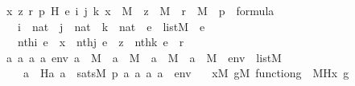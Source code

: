 \begin{isabellebody}
\ \ {\isachardoublequoteopen}{\isasymAnd}x\ z\ r\ p\ H\ e\ i\ j\ k{\isachardot}{\kern0pt}\ x\ {\isasymin}\ M\ {\isasymLongrightarrow}\ z\ {\isasymin}\ M\ {\isasymLongrightarrow}\ r\ {\isasymin}\ M\ {\isasymLongrightarrow}\ p\ {\isasymin}\ formula\ {\isasymLongrightarrow}\isanewline
\ \ \ \ i\ {\isasymin}\ nat\ {\isasymLongrightarrow}\ j\ {\isasymin}\ nat\ {\isasymLongrightarrow}\ k\ {\isasymin}\ nat\ {\isasymLongrightarrow}\ e\ {\isasymin}\ list{\isacharparenleft}{\kern0pt}M{\isacharparenright}{\kern0pt}\ {\isasymLongrightarrow}\ e\ {\isasymnoteq}\ {\isacharbrackleft}{\kern0pt}{\isacharbrackright}{\kern0pt}\ {\isasymLongrightarrow}\ \isanewline
\ \ \ \ nth{\isacharparenleft}{\kern0pt}i{\isacharcomma}{\kern0pt}\ e{\isacharparenright}{\kern0pt}\ {\isacharequal}{\kern0pt}\ x\ {\isasymLongrightarrow}\ nth{\isacharparenleft}{\kern0pt}j{\isacharcomma}{\kern0pt}\ e{\isacharparenright}{\kern0pt}\ {\isacharequal}{\kern0pt}\ z\ {\isasymLongrightarrow}\ nth{\isacharparenleft}{\kern0pt}k{\isacharcomma}{\kern0pt}\ e{\isacharparenright}{\kern0pt}\ {\isacharequal}{\kern0pt}\ r\ {\isasymLongrightarrow}\ \isanewline
\ \ {\isacharparenleft}{\kern0pt}{\isasymAnd}a{}\ a{}\ a{}\ a{}\ env{\isachardot}{\kern0pt}\ a{}\ {\isasymin}\ M\ {\isasymLongrightarrow}\ a{}\ {\isasymin}\ M\ {\isasymLongrightarrow}\ a{}\ {\isasymin}\ M\ {\isasymLongrightarrow}\ a{}\ {\isasymin}\ M\ {\isasymLongrightarrow}\ env\ {\isasymin}\ list{\isacharparenleft}{\kern0pt}M{\isacharparenright}{\kern0pt}\ \isanewline
\ \ \ \ {\isasymLongrightarrow}\ a{}\ {\isacharequal}{\kern0pt}\ H{\isacharparenleft}{\kern0pt}a{}{\isacharcomma}{\kern0pt}\ a{}{\isacharparenright}{\kern0pt}\ {\isasymlongleftrightarrow}\ sats{\isacharparenleft}{\kern0pt}M{\isacharcomma}{\kern0pt}\ p{\isacharcomma}{\kern0pt}\ {\isacharbrackleft}{\kern0pt}a{}{\isacharcomma}{\kern0pt}\ a{}{\isacharcomma}{\kern0pt}\ a{}{\isacharcomma}{\kern0pt}\ a{}{\isacharbrackright}{\kern0pt}\ {\isacharat}{\kern0pt}\ env{\isacharparenright}{\kern0pt}{\isacharparenright}{\kern0pt}\ {\isasymLongrightarrow}\isanewline
\ \ {\isacharparenleft}{\kern0pt}{\isasymforall}x{\isacharbrackleft}{\kern0pt}{\isacharhash}{\kern0pt}{\isacharhash}{\kern0pt}M{\isacharbrackright}{\kern0pt}{\isachardot}{\kern0pt}\ {\isasymforall}g{\isacharbrackleft}{\kern0pt}{\isacharhash}{\kern0pt}{\isacharhash}{\kern0pt}M{\isacharbrackright}{\kern0pt}{\isachardot}{\kern0pt}\ function{\isacharparenleft}{\kern0pt}g{\isacharparenright}{\kern0pt}\ {\isasymlongrightarrow}\ {\isacharparenleft}{\kern0pt}{\isacharhash}{\kern0pt}{\isacharhash}{\kern0pt}M{\isacharparenright}{\kern0pt}{\isacharparenleft}{\kern0pt}H{\isacharparenleft}{\kern0pt}x{\isacharcomma}{\kern0pt}\ g{\isacharparenright}{\kern0pt}{\isacharparenright}{\kern0pt}{\isacharparenright}{\kern0pt}\ {\isasymLongrightarrow}\isanewline

\end{isabellebody}
